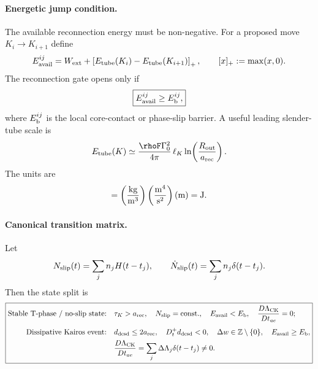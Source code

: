 \paragraph{Energetic jump condition.}
The available reconnection energy must be non-negative. For a proposed move $K_i\to K_{i+1}$ define
\begin{equation}
    E_{\rm avail}^{ij}
    =
    W_{\rm ext}
    +
    \left[ E_{\rm tube}(K_i)-E_{\rm tube}(K_{i+1})\right]_+,
    \qquad
    [x]_+:=\max(x,0).
    \label{eq:sst_positive_part_available_energy}
\end{equation}
The reconnection gate opens only if
\begin{equation}
    \boxed{
    E_{\rm avail}^{ij}\ge E_{\rm b}^{ij},
    }
    \label{eq:sst_reconnection_energy_gate}
\end{equation}
where $E_{\rm b}^{ij}$ is the local core-contact or phase-slip barrier. A useful leading slender-tube scale is
\begin{equation}
    E_{\rm tube}(K)
    \simeq
    \frac{\rhoF\Gamma_0^2}{4\pi}\,
    \ell_K
    \ln\!\left(\frac{R_{\rm out}}{a_{\rm rec}}\right).
    \label{eq:sst_slender_tube_energy_hitting}
\end{equation}
The units are
\begin{equation}
    [\rhoF\Gamma_0^2\ell_K]
    =
    \left(\frac{\rm kg}{{\rm m}^3}\right)
    \left(\frac{{\rm m}^4}{{\rm s}^2}\right)
    ({\rm m})
    =
    {\rm J}.
    \label{eq:sst_hitting_energy_units}
\end{equation}

\paragraph{Canonical transition matrix.}
Let
\begin{equation}
    N_{\rm slip}(t)
    =
    \sum_j n_jH(t-t_j),
    \qquad
    \dot N_{\rm slip}(t)
    =
    \sum_j n_j\delta(t-t_j).
    \label{eq:sst_phase_slip_counter}
\end{equation}
Then the state split is
\begin{equation}
\boxed{
\begin{aligned}
\text{Stable T-phase / no-slip state:}\quad
& \tau_K>a_{\rm rec},
\quad N_{\rm slip}={\rm const.},
\quad E_{\rm avail}<E_{\rm b},
\quad \frac{D\Lambda_{\rm CK}}{Dt_{ae}}=0;\\[0.4em]
\text{Dissipative Kairos event:}\quad
& d_{\rm dcsd}\le2a_{\rm rec},
\quad D_t^+d_{\rm dcsd}<0,
\quad \Delta w\in\mathbb Z\setminus\{0\},
\quad E_{\rm avail}\ge E_{\rm b},\\
& \frac{D\Lambda_{\rm CK}}{Dt_{ae}}
=\sum_j\Delta\Lambda_j\delta(t-t_j)\ne0.
\end{aligned}}
\label{eq:sst_canonical_transition_matrix_hitting}
\end{equation}

